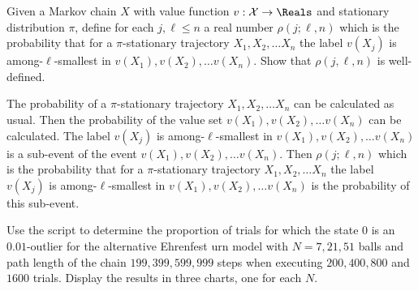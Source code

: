 \documentclass[12pt]{article}
\begin{document}
\begin{exercise}
    Given a Markov chain \( X \) with value function \( v:  \mathcal{X} \to
    \Reals \) and stationary distribution \( \pi \), define for each \(
    j, \ell \le n \) a real number \( \rho(j; \ell, n) \) which is the
    probability that for a \( \pi \)-stationary trajectory \( X_1, X_2,
    \dots X_n \) the label \( v(X_j) \) is among-\( \ell \)-smallest in \( v(X_1),
    v(X_2), \dots v(X_n) \).  Show that \( \rho(j,\ell, n) \) is
    well-defined.  
\end{exercise}
\begin{solution}
  The probability of a \( \pi \)-stationary trajectory \( X_1, X_2,
    \dots X_n \) can be calculated as usual.  Then the probability of
    the value set \( v(X_1), v(X_2), \dots v(X_n) \) can be
    calculated.  The label \( v(X_j) \) is among-\( \ell \)-smallest in \( v(X_1),
    v(X_2), \dots v(X_n) \) is a sub-event of the event \( v(X_1),
    v(X_2), \dots v(X_n) \).  Then \( \rho(j; \ell, n) \) which is the
    probability that for a \( \pi \)-stationary trajectory \( X_1, X_2,
    \dots X_n \) the label \( v(X_j) \) is among-\( \ell \)-smallest in \( v(X_1),
    v(X_2), \dots v(X_n) \) is the probability of this sub-event.
\end{solution}
\begin{exercise}
    Use the script to determine the proportion of trials for which the
    state \( 0 \) is an \( 0.01 \)-outlier for the alternative Ehrenfest
    urn model with \( N = 7, 21, 51 \) balls and path length of the
    chain \( 199, 399, 599, 999 \) steps when executing \( 200, 400, 800
    \) and \( 1600 \) trials.  Display the results in three charts, one
    for each \( N \).
\end{exercise}
\end{document}
